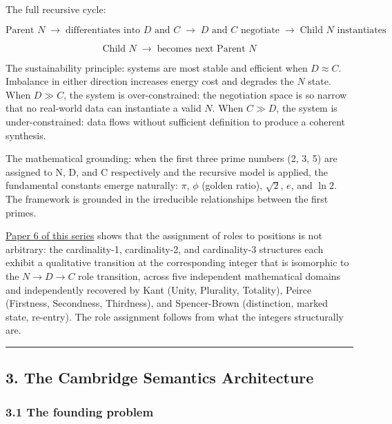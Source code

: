 \documentclass[
  11pt,
  letterpaper,
]{article}
\begin{document}
The full recursive cycle:

\[\text{Parent } N \;\to\; \text{differentiates into } D \text{ and } C \;\to\; D \text{ and } C \text{ negotiate} \;\to\; \text{Child } N \text{ instantiates}\]

\[\text{Child } N \;\to\; \text{becomes next Parent } N\]

The sustainability principle: systems are most stable and efficient when
\(D \approx C\). Imbalance in either direction increases energy cost and
degrades the \(N\) state. When \(D \gg C\), the system is
over-constrained: the negotiation space is so narrow that no real-world
data can instantiate a valid \(N\). When \(C \gg D\), the system is
under-constrained: data flows without sufficient definition to produce a
coherent synthesis.

The mathematical grounding: when the first three prime numbers (2, 3, 5)
are assigned to N, D, and C respectively and the recursive model is
applied, the fundamental constants emerge naturally: \(\pi\), \(\phi\)
(golden ratio), \(\sqrt{2}\), \(e\), and \(\ln 2\). The framework is
grounded in the irreducible relationships between the first primes.

\href{https://github.com/baardev/truevalue/blob/main/docnav/Research/papers/6_qualitative-nature-integers-triadic-roles/6_qualitative-nature-integers-triadic-roles.pdf}{Paper
6 of this series} shows that the assignment of roles to positions is not
arbitrary: the cardinality-1, cardinality-2, and cardinality-3
structures each exhibit a qualitative transition at the corresponding
integer that is isomorphic to the \(N \to D \to C\) role transition,
across five independent mathematical domains and independently recovered
by Kant (Unity, Plurality, Totality), Peirce (Firstness, Secondness,
Thirdness), and Spencer-Brown (distinction, marked state, re-entry). The
role assignment follows from what the integers structurally are.

\begin{center}\rule{0.5\linewidth}{0.5pt}\end{center}

\subsection{3. The Cambridge Semantics
Architecture}\label{the-cambridge-semantics-architecture}

\subsubsection{3.1 The founding problem}\label{the-founding-problem}
\end{document}

